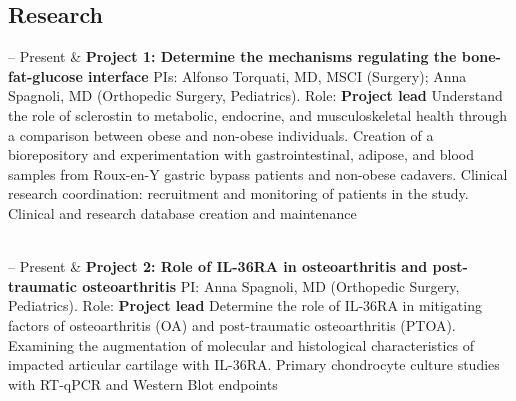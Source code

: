 \documentclass[10pt, letterpaper]{article}
\newcommand{\Duration}[2]{\fontsize{9pt}{0}\selectfont #1 -- #2}
\newcommand{\Ongoing}{Present} %
\newcommand{\Twoline}[2]{\textbf{#1}\newline  #2}
\begin{document}
\subsection{Research}
\begin{EntriesTable}
  \Duration{2021}{\Ongoing} &
  \Twoline{Project 1: Determine the mechanisms regulating the bone-fat-glucose interface}{
    PIs: Alfonso Torquati, MD, MSCI (Surgery); Anna Spagnoli, MD (Orthopedic Surgery, Pediatrics).\newline
    Role: \textbf{Project lead}\newline
    Understand the role of sclerostin to metabolic, endocrine, and musculoskeletal health through a comparison between obese and non-obese individuals.\newline
    Creation of a biorepository and experimentation with gastrointestinal, adipose, and blood samples from Roux-en-Y gastric bypass patients and non-obese cadavers.\newline
    Clinical research coordination: recruitment and monitoring of patients in the study.\newline
    Clinical and research database creation and maintenance
  }
  \\
  \Duration{2021}{\Ongoing} &
  \Twoline{Project 2: Role of IL-36RA in osteoarthritis and post-traumatic osteoarthritis}{
    PI: Anna Spagnoli, MD (Orthopedic Surgery, Pediatrics).\newline
    Role: \textbf{Project lead}\newline
    Determine the role of IL-36RA in mitigating factors of osteoarthritis (OA) and post-traumatic osteoarthritis (PTOA).\newline
    Examining the augmentation of molecular and histological characteristics of impacted articular cartilage with IL-36RA.\newline
    Primary chondrocyte culture studies with RT-qPCR and Western Blot endpoints

}
\end{EntriesTable}
\end{document}
